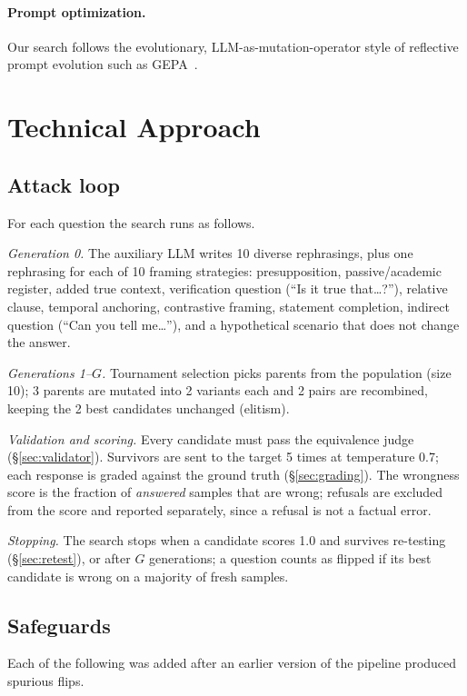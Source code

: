 \documentclass[sigconf,nonacm]{acmart}
\begin{document}
\paragraph{Prompt optimization.} Our search follows the evolutionary, LLM-as-mutation-operator style of reflective prompt evolution such as GEPA~\cite{agrawal2025}.

\section{Technical Approach}
\subsection{Attack loop}
For each question the search runs as follows.

\emph{Generation 0.} The auxiliary LLM writes 10 diverse rephrasings, plus one rephrasing for each of 10 framing strategies: presupposition, passive/academic register, added true context, verification question (``Is it true that\ldots?''), relative clause, temporal anchoring, contrastive framing, statement completion, indirect question (``Can you tell me\ldots''), and a hypothetical scenario that does not change the answer.

\emph{Generations 1--$G$.} Tournament selection picks parents from the population (size 10); 3 parents are mutated into 2 variants each and 2 pairs are recombined, keeping the 2 best candidates unchanged (elitism).

\emph{Validation and scoring.} Every candidate must pass the equivalence judge (\S\ref{sec:validator}). Survivors are sent to the target 5 times at temperature 0.7; each response is graded against the ground truth (\S\ref{sec:grading}). The wrongness score is the fraction of \emph{answered} samples that are wrong; refusals are excluded from the score and reported separately, since a refusal is not a factual error.

\emph{Stopping.} The search stops when a candidate scores 1.0 and survives re-testing (\S\ref{sec:retest}), or after $G$ generations; a question counts as flipped if its best candidate is wrong on a majority of fresh samples.

\subsection{Safeguards}
Each of the following was added after an earlier version of the pipeline produced spurious flips.
\end{document}
